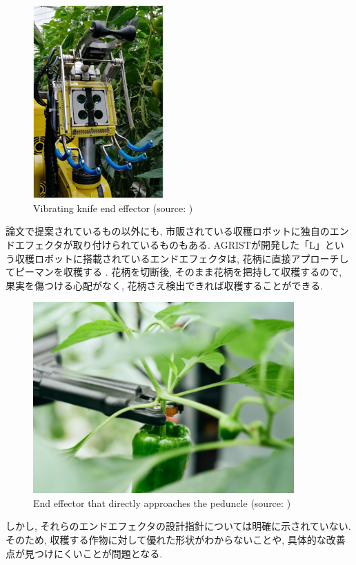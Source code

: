 \vspace{5mm}
\begin{figure}[H]
     \centering
     \includegraphics[width=50mm]{images/png/sweeper.png}
     \caption[Vibrating knife end effector]{Vibrating knife end effector (source: \cite{sweeper})}
     \label{Fig:sweeper}
\end{figure}

論文で提案されているもの以外にも, 市販されている収穫ロボットに独自のエンドエフェクタが取り付けられているものもある.
AGRISTが開発した「L」という収穫ロボットに搭載されているエンドエフェクタは, 花柄に直接アプローチしてピーマンを収穫する \cite{agrist}.
花柄を切断後, そのまま花柄を把持して収穫するので, 果実を傷つける心配がなく, 花柄さえ検出できれば収穫することができる.

\vspace{5mm}
\begin{figure}[H]
     \centering
     \includegraphics[width=100mm]{images/png/agrist.png}
     \caption[End effector that directly approaches the peduncle]{End effector that directly approaches the peduncle (source: \cite{agrist})}
     \label{Fig:agrist}
\end{figure}

しかし, それらのエンドエフェクタの設計指針については明確に示されていない.
そのため, 収穫する作物に対して優れた形状がわからないことや, 具体的な改善点が見つけにくいことが問題となる.

\newpage
